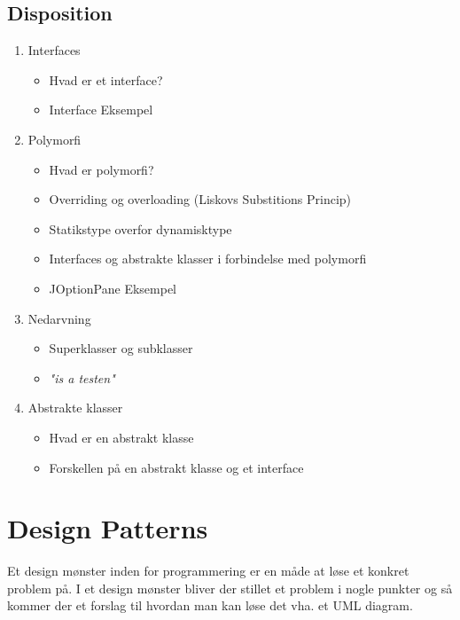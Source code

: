 \documentclass{article}
\begin{document}
\newpage
\subsection{Disposition}
\begin{enumerate}
	\item Interfaces
	\begin{itemize}
		\item Hvad er et interface?
		\item Interface Eksempel 
	\end{itemize}
	\item Polymorfi 
	\begin{itemize}
		\item Hvad er polymorfi?
		\item Overriding og overloading (Liskovs Substitions Princip)
		\item Statikstype overfor dynamisktype
		\item Interfaces og abstrakte klasser i forbindelse med polymorfi
		\item JOptionPane Eksempel
	\end{itemize}
		\item Nedarvning 
	\begin{itemize}
		\item Superklasser og subklasser
		\item \textit{"is a testen"}
	\end{itemize}
		\item Abstrakte klasser
		\begin{itemize}
			\item Hvad er en abstrakt klasse
			\item Forskellen på en abstrakt klasse og et interface
		\end{itemize}
\end{enumerate}
\newpage

\section{Design Patterns}
Et design mønster inden for programmering er en måde at løse et konkret problem på. I et design mønster bliver der stillet et problem i nogle punkter og så kommer der et forslag til hvordan man kan løse det vha. et UML diagram. 
\end{document}
